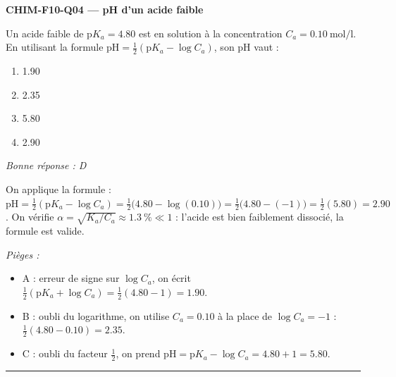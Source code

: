 \documentclass[11pt,a4paper]{article}
\begin{document}
\noindent\textbf{CHIM-F10-Q04 --- pH d'un acide faible}\par
Un acide faible  de $\mathrm{p}K_a = \num{4.80}$ est en solution à la concentration $C_a = \qty{0.10}{\mol\per\litre}$. En utilisant la formule $\mathrm{pH} = \tfrac{1}{2}(\mathrm{p}K_a - \log C_a)$, son pH vaut :
\begin{enumerate}[label=\Alph*)]
\item \num{1.90}
\item \num{2.35}
\item \num{5.80}
\item \num{2.90}
\end{enumerate}
\textit{Bonne réponse : D}\par
On applique la formule : $\mathrm{pH} = \tfrac12(\mathrm{p}K_a - \log C_a) = \tfrac12\bigl(\num{4.80} - \log(\num{0.10})\bigr) = \tfrac12\bigl(\num{4.80} - (\num{-1})\bigr) = \tfrac12(\num{5.80}) = \num{2.90}$. On vérifie $\alpha = \sqrt{K_a/C_a} \approx \qty{1.3}{\percent} \ll 1$ : l'acide est bien faiblement dissocié, la formule est valide.\par
\textit{Pièges :}
\begin{itemize}
\item A : erreur de signe sur $\log C_a$, on écrit $\tfrac12(\mathrm{p}K_a + \log C_a) = \tfrac12(\num{4.80}-\num{1}) = \num{1.90}$.
\item B : oubli du logarithme, on utilise $C_a = \num{0.10}$ à la place de $\log C_a = \num{-1}$ : $\tfrac12(\num{4.80}-\num{0.10}) = \num{2.35}$.
\item C : oubli du facteur $\tfrac12$, on prend $\mathrm{pH} = \mathrm{p}K_a - \log C_a = \num{4.80}+\num{1} = \num{5.80}$.
\end{itemize}
\vspace{6pt}\hrule\vspace{8pt}
\end{document}
